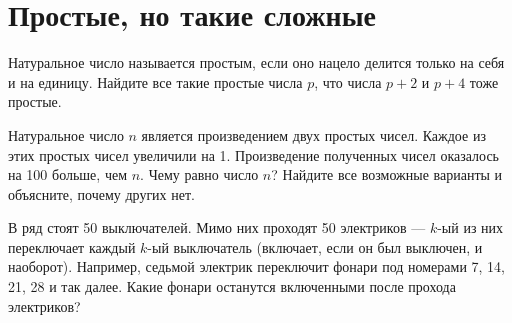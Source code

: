 \section{Простые, но такие сложные}
\begin{itemize}

\itA Натуральное число называется простым, если оно нацело делится только на себя и на единицу. Найдите все такие простые числа $p$, что числа $p+2$ и $p+4$ тоже простые.

\itB Натуральное число $n$ является произведением двух простых чисел. Каждое из этих простых чисел увеличили на 1. Произведение полученных чисел оказалось на 100 больше, чем $n$. Чему равно число $n$? Найдите все возможные варианты и объясните, почему других нет.

\itC В ряд стоят 50 выключателей. Мимо них проходят 50 электриков --- $k$-ый из них переключает каждый $k$-ый выключатель (включает, если он был выключен, и наоборот). Например, седьмой электрик переключит фонари под номерами 7, 14, 21, 28 и так далее. Какие фонари останутся включенными после прохода электриков?
\end{itemize}